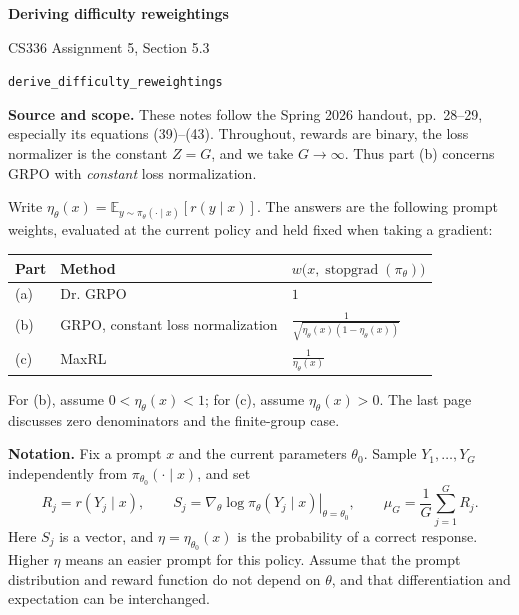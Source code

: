 \documentclass[11pt,a4paper]{article}
\newcommand{\E}{\mathbb{E}}
\newcommand{\sg}{\operatorname{stopgrad}}
\begin{document}
\begin{center}
  {\LARGE\bfseries Deriving difficulty reweightings}\par
  \vspace{4pt}
  {\large CS336 Assignment 5, Section 5.3}\par
  \texttt{derive\_difficulty\_reweightings}
\end{center}

\textbf{Source and scope.} These notes follow the Spring 2026 handout,
pp.~28--29, especially its equations (39)--(43). Throughout, rewards are binary,
the loss normalizer is the constant $Z=G$, and we take $G\to\infty$.
Thus part (b) concerns GRPO with \emph{constant} loss normalization.

Write $\eta_\theta(x)=\E_{y\sim\pi_\theta(\cdot\mid x)}[r(y\mid x)]$.
The answers are the following prompt weights, evaluated at the current policy
and held fixed when taking a gradient:
\begin{center}
\renewcommand{\arraystretch}{1.6}
\begin{tabular}{lll}
\toprule
Part & Method & $w\bigl(x,\sg(\pi_\theta)\bigr)$ \\
\midrule
(a) & Dr. GRPO & $1$ \\
(b) & GRPO, constant loss normalization & $\displaystyle \frac{1}{\sqrt{\eta_\theta(x)(1-\eta_\theta(x))}}$ \\
(c) & MaxRL & $\displaystyle \frac{1}{\eta_\theta(x)}$ \\
\bottomrule
\end{tabular}
\end{center}
For (b), assume $0<\eta_\theta(x)<1$; for (c), assume $\eta_\theta(x)>0$.
The last page discusses zero denominators and the finite-group case.

\textbf{Notation.} Fix a prompt $x$ and the current parameters $\theta_0$.
Sample $Y_1,\ldots,Y_G$ independently from $\pi_{\theta_0}(\cdot\mid x)$, and set
\begin{equation}
  R_j=r(Y_j\mid x),\qquad
  S_j=\left.\nabla_\theta\log\pi_\theta(Y_j\mid x)\right|_{\theta=\theta_0},\qquad
  \mu_G=\frac{1}{G}\sum_{j=1}^{G}R_j.
\end{equation}
Here $S_j$ is a vector, and $\eta=\eta_{\theta_0}(x)$ is the probability of a
correct response. Higher $\eta$ means an easier prompt for this policy.
Assume that the prompt distribution and reward function do not depend on
$\theta$, and that differentiation and expectation can be interchanged.
\end{document}
